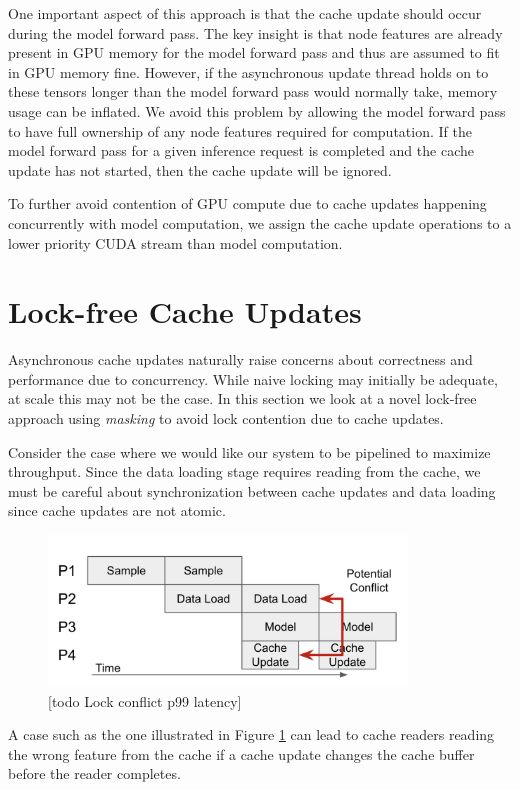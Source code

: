 One important aspect of this approach is that the cache update should occur during the model forward pass.
The key insight is that node features are already present in GPU memory for the model forward pass and thus are assumed to fit in GPU memory fine.
However, if the asynchronous update thread holds on to these tensors longer than the model forward pass would normally take, memory usage can be inflated. 
We avoid this problem by allowing the model forward pass to have full ownership of any node features required for computation.
If the model forward pass for a given inference request is completed and the cache update has not started, then the cache update will be ignored.

To further avoid contention of GPU compute due to cache updates happening concurrently with model computation, we assign the cache update operations to a lower priority CUDA stream than model computation.

\section{Lock-free Cache Updates} \label{Design: Lock-free}
Asynchronous cache updates naturally raise concerns about correctness and performance due to concurrency. While naive locking may initially be adequate, at scale this may not be the case. In this section we look at a novel lock-free approach using \textit{masking} to avoid lock contention due to cache updates.


Consider the case where we would like our system to be pipelined to maximize throughput. Since the data loading stage requires reading from the cache, we must be careful about synchronization between cache updates and data loading since cache updates are not atomic.
\begin{figure}[h!]
    \centering
    \includegraphics[width=0.85\textwidth]{figures/Pipeline no lock.png}
    \caption{[todo Lock conflict p99 latency]}
    \label{Impl: Conflict pipeline}
\end{figure}     
A case such as the one illustrated in Figure \ref{Impl: Conflict pipeline} can lead to cache readers reading the wrong feature from the cache if a cache update changes the cache buffer before the reader completes. 

